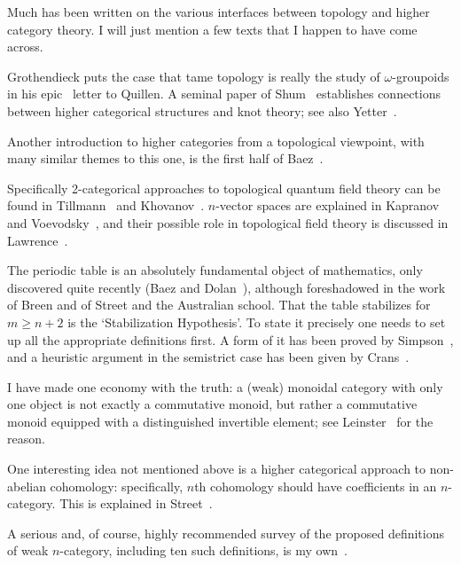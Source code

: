\begin{notes}

Much has been written on the various interfaces between topology and higher
category theory.  I will just mention a few texts that I happen to have
come across.

Grothendieck%
%
%
puts the case that tame topology is really the study of
$\omega$-groupoids%
%
%
in his epic~\cite{GroPS} letter to Quillen.  A seminal paper of
 Shum~\cite{Shum}%
%
%
establishes connections between higher
categorical structures and knot%
%
%
theory; see also Yetter~\cite{Yet}.

Another introduction to higher categories from a topological viewpoint,
with many similar themes to this one, is the first half of
Baez~\cite{BzIN}.%
%
%

Specifically 2-categorical approaches to topological quantum field theory%
%
%
can be found in Tillmann~\cite{Till}%
%
%
and Khovanov~\cite{KhoFVI}.%
%
%
$n$-vector spaces%
%
%
are explained in Kapranov%
%
%
and Voevodsky~\cite{KV},%
%
%
and
their possible role in topological field theory is discussed in
Lawrence~\cite{Law}.%
%
%

The periodic%
%
%
table is an absolutely fundamental object of mathematics, only
discovered quite recently (Baez%
%
%
and Dolan~\cite{BDHDA0}),%
%
%
although
foreshadowed in the work of Breen%
%
%
and of Street%
%
%
and the Australian school.  That the table stabilizes for $m\geq n+2$ is
the `Stabilization%
%
%
Hypothesis'.  To state it precisely one needs to set up all the appropriate
definitions first.  A form of it has been proved by Simpson~\cite{SimOBB},%
%
%
and a heuristic argument in the semistrict case has been given by
Crans~\cite[3.8]{CraBSS}.%
%
%

I have made one economy with the truth: a (weak) monoidal%
%
%
category with
only one object is not exactly a commutative monoid,%
%
%
but rather a
commutative monoid equipped with a distinguished invertible element; see
Leinster~\cite[1.6(vii)]{GECM} for the reason.

One interesting idea not mentioned above is a higher categorical approach
to non-abelian cohomology:%
%
%
%
%
specifically, $n$th cohomology should have
coefficients in an $n$-category.  This is explained in
Street~\cite[Introduction]{StrAOS}.%
%
%

A serious and, of course, highly recommended survey of the proposed
definitions of weak $n$-category,%
%
%
including ten such definitions, is my
own~\cite{SDN}.

\end{notes}



